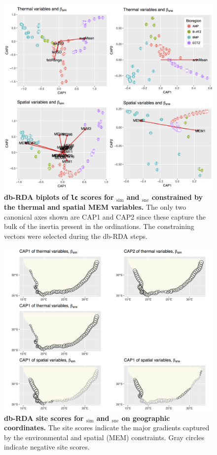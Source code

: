 \documentclass[utf8]{frontiersSCNS} %
\begin{document}
\begin{figure}[!ht]
\centering
\includegraphics[width=1.0\textwidth]{../figures/Fig2.jpg}
\caption{{\bf db-RDA biplots of \texttt{lc} scores for \textbeta$_{\text{sim}}$ and \textbeta$_{\text{sne}}$ constrained by the thermal and spatial MEM variables.} The only two canonical axes shown are CAP1 and CAP2 since these capture the bulk of the inertia present in the ordinations. The constraining vectors were selected during the db-RDA steps.}
\label{fig2}
\end{figure}

\begin{figure}[!ht]
\centering
\includegraphics[width=1.0\textwidth]{../figures/Fig3.jpg}
\caption{{\bf db-RDA site scores for \textbeta$_{\text{sim}}$ and \textbeta$_{\text{sne}}$ on geographic coordinates.} The site scores indicate the major gradients captured by the environmental and spatial (MEM) constraints. Gray circles indicate negative site scores.}
\label{fig3}
\end{figure}
\end{document}
